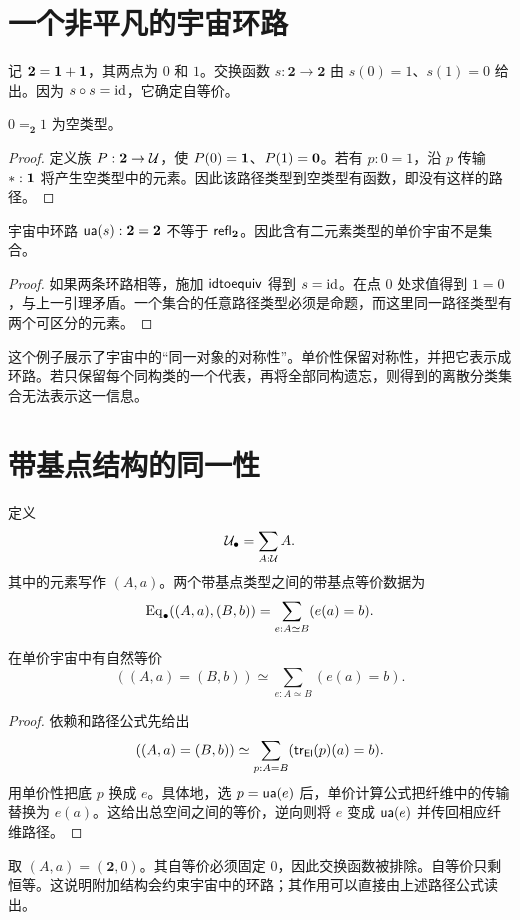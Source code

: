 \section{一个非平凡的宇宙环路}
\begin{definition}[二元素类型]
记 $\mathbf2=\mathbf 1+\mathbf 1$，其两点为 $0$ 和 $1$。交换函数 $s:\mathbf2\to\mathbf2$ 由 $s(0)=1$、$s(1)=0$ 给出。因为 $s\circ s=\operatorname{id}$，它确定自等价。
\end{definition}
\begin{lemma}
$0=_{\mathbf2}1$ 为空类型。
\end{lemma}
\begin{proof}
定义族 $P:\mathbf2\to\mathcal U$，使 $P(0)=\mathbf 1$、$P(1)=\mathbf 0$。若有 $p:0=1$，沿 $p$ 传输 $*:\mathbf 1$ 将产生空类型中的元素。因此该路径类型到空类型有函数，即没有这样的路径。
\end{proof}
\begin{proposition}
宇宙中环路 $\mathsf{ua}(s):\mathbf2=\mathbf2$ 不等于 $\mathsf{refl}_{\mathbf2}$。因此含有二元素类型的单价宇宙不是集合。
\end{proposition}
\begin{proof}
如果两条环路相等，施加 $\mathsf{idtoequiv}$ 得到 $s=\operatorname{id}$。在点 $0$ 处求值得到 $1=0$，与上一引理矛盾。一个集合的任意路径类型必须是命题，而这里同一路径类型有两个可区分的元素。
\end{proof}
\begin{remark}
这个例子展示了宇宙中的“同一对象的对称性”。单价性保留对称性，并把它表示成环路。若只保留每个同构类的一个代表，再将全部同构遗忘，则得到的离散分类集合无法表示这一信息。
\end{remark}

\section{带基点结构的同一性}
\begin{definition}[带基点类型]
定义
\[
\mathcal U_\bullet=\sum_{A:\mathcal U}A.
\]
其中的元素写作 $(A,a)$。两个带基点类型之间的带基点等价数据为
\[
\operatorname{Eq}_\bullet((A,a),(B,b))
=\sum_{e:A\simeq B}(e(a)=b).
\]
\end{definition}
\begin{theorem}[带基点结构同一性]
在单价宇宙中有自然等价
\[
((A,a)=(B,b))\simeq
\sum_{e:A\simeq B}(e(a)=b).
\]
\end{theorem}
\begin{proof}
依赖和路径公式先给出
\[
((A,a)=(B,b))\simeq
\sum_{p:A=B}(\mathsf{tr}_{\mathsf{El}}(p)(a)=b).
\]
用单价性把底 $p$ 换成 $e$。具体地，选 $p=\mathsf{ua}(e)$ 后，单价计算公式把纤维中的传输替换为 $e(a)$。这给出总空间之间的等价，逆向则将 $e$ 变成 $\mathsf{ua}(e)$ 并传回相应纤维路径。
\end{proof}
\begin{example}
取 $(A,a)=(\mathbf2,0)$。其自等价必须固定 $0$，因此交换函数被排除。自等价只剩恒等。这说明附加结构会约束宇宙中的环路；其作用可以直接由上述路径公式读出。
\end{example}

